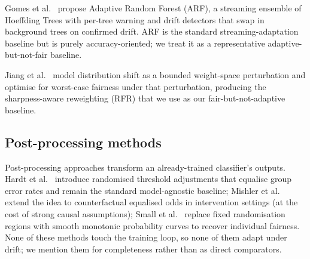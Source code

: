 \documentclass[sigconf,anonymous,review]{acmart}
\begin{document}
Gomes et al.~\cite{10.1007/s10994-017-5642-8} propose Adaptive Random Forest (\textsc{ARF}), a streaming ensemble of Hoeffding Trees with per-tree warning and drift detectors that swap in background trees on confirmed drift. \textsc{ARF} is the standard streaming-adaptation baseline but is purely accuracy-oriented; we treat it as a representative adaptive-but-not-fair baseline.

Jiang et al.~\cite{jiang2023chasingfairnessdistributionshift} model distribution shift as a bounded weight-space perturbation and optimise for worst-case fairness under that perturbation, producing the sharpness-aware reweighting (\textsc{RFR}) that we use as our fair-but-not-adaptive baseline.
\subsection{Post-processing methods}
Post-processing approaches transform an already-trained classifier's outputs. Hardt et al.~\cite{hardt2016equalityopportunitysupervisedlearning} introduce randomised threshold adjustments that equalise group error rates and remain the standard model-agnostic baseline; Mishler et al.~\cite{Mishler_2021} extend the idea to counterfactual equalised odds in intervention settings (at the cost of strong causal assumptions); Small et al.~\cite{Small_2024} replace fixed randomisation regions with smooth monotonic probability curves to recover individual fairness. None of these methods touch the training loop, so none of them adapt under drift; we mention them for completeness rather than as direct comparators.
\end{document}
